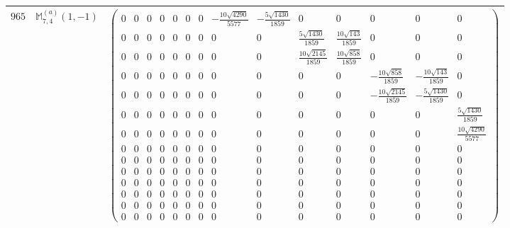 \documentclass[fleqn,8pt,landscape]{jsarticle}
\begin{document}
\begin{center}
\begin{longtable}{ccc}
$ 965 $ & $ \mathbb{M}_{7,4}^{(a)}(1,-1) $ & $ \begin{pmatrix} 0 & 0 & 0 & 0 & 0 & 0 & 0 & - \frac{10 \sqrt{4290}}{5577} & - \frac{5 \sqrt{1430}}{1859} & 0 & 0 & 0 & 0 & 0 \\ 0 & 0 & 0 & 0 & 0 & 0 & 0 & 0 & 0 & \frac{5 \sqrt{1430}}{1859} & \frac{10 \sqrt{143}}{1859} & 0 & 0 & 0 \\ 0 & 0 & 0 & 0 & 0 & 0 & 0 & 0 & 0 & \frac{10 \sqrt{2145}}{1859} & \frac{10 \sqrt{858}}{1859} & 0 & 0 & 0 \\ 0 & 0 & 0 & 0 & 0 & 0 & 0 & 0 & 0 & 0 & 0 & - \frac{10 \sqrt{858}}{1859} & - \frac{10 \sqrt{143}}{1859} & 0 \\ 0 & 0 & 0 & 0 & 0 & 0 & 0 & 0 & 0 & 0 & 0 & - \frac{10 \sqrt{2145}}{1859} & - \frac{5 \sqrt{1430}}{1859} & 0 \\ 0 & 0 & 0 & 0 & 0 & 0 & 0 & 0 & 0 & 0 & 0 & 0 & 0 & \frac{5 \sqrt{1430}}{1859} \\ 0 & 0 & 0 & 0 & 0 & 0 & 0 & 0 & 0 & 0 & 0 & 0 & 0 & \frac{10 \sqrt{4290}}{5577} \\ 0 & 0 & 0 & 0 & 0 & 0 & 0 & 0 & 0 & 0 & 0 & 0 & 0 & 0 \\ 0 & 0 & 0 & 0 & 0 & 0 & 0 & 0 & 0 & 0 & 0 & 0 & 0 & 0 \\ 0 & 0 & 0 & 0 & 0 & 0 & 0 & 0 & 0 & 0 & 0 & 0 & 0 & 0 \\ 0 & 0 & 0 & 0 & 0 & 0 & 0 & 0 & 0 & 0 & 0 & 0 & 0 & 0 \\ 0 & 0 & 0 & 0 & 0 & 0 & 0 & 0 & 0 & 0 & 0 & 0 & 0 & 0 \\ 0 & 0 & 0 & 0 & 0 & 0 & 0 & 0 & 0 & 0 & 0 & 0 & 0 & 0 \\ 0 & 0 & 0 & 0 & 0 & 0 & 0 & 0 & 0 & 0 & 0 & 0 & 0 & 0 \end{pmatrix} $ \\ \hline

\end{longtable}
\end{center}
\end{document}
